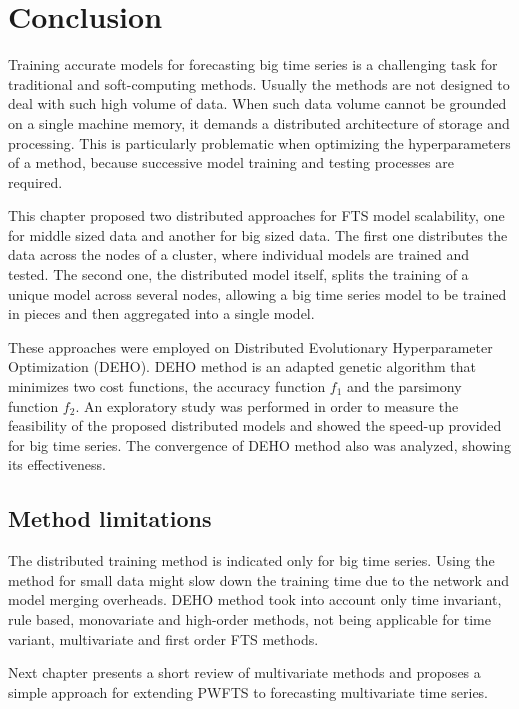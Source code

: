 \section{Conclusion}
\label{sec:scalability_conclusion}

Training accurate models for forecasting big time series is a challenging task for traditional and soft-computing methods. Usually the methods are not designed to deal with such high volume of data. When such data volume cannot be grounded on a single machine memory, it demands a distributed architecture of storage and processing. This is particularly problematic when optimizing the hyperparameters of a method, because successive model training and testing processes are required. 

This chapter proposed two distributed approaches for FTS model scalability, one for middle sized data and another for big sized data. The first one distributes the data across the nodes of a cluster, where individual models are trained and tested. The second one, the distributed model itself, splits the training of a unique model across several nodes, allowing a big time series model to be trained in pieces and then aggregated into a single model.

These approaches were employed on Distributed Evolutionary Hyperparameter Optimization (DEHO). DEHO method is an adapted genetic algorithm that minimizes two cost functions, the accuracy function $f_1$ and the parsimony function $f_2$. An exploratory study was performed in order to measure the feasibility of the proposed distributed models and showed the speed-up provided for big time series. The convergence of DEHO method also was analyzed, showing its effectiveness.

\subsection{Method limitations}

The distributed training method is indicated only for big time series. Using the method for small data might slow down the training time due to the network and model merging overheads. DEHO method took into account only time invariant, rule based, monovariate and high-order methods, not being applicable for time variant, multivariate and first order FTS methods.  

Next chapter presents a short review of multivariate methods and proposes a simple approach for extending PWFTS to forecasting multivariate time series.


